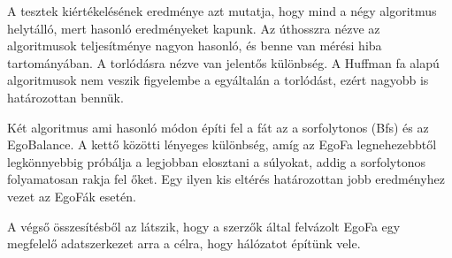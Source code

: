 \documentclass[12pt]{report}
\begin{document}
A tesztek kiértékelésének eredménye azt mutatja, hogy mind a négy algoritmus helytálló, mert hasonló eredményeket kapunk.
Az úthosszra nézve az algoritmusok teljesítménye nagyon hasonló, és benne van mérési hiba tartományában.
A torlódásra nézve van jelentős különbség.
A Huffman fa alapú algoritmusok nem veszik figyelembe a egyáltalán a torlódást, ezért nagyobb is határozottan bennük.
 
Két algoritmus ami hasonló módon építi fel a fát az a sorfolytonos (Bfs) és az EgoBalance. 
A kettő közötti lényeges különbség, amíg az EgoFa legnehezebbtől legkönnyebbig próbálja a legjobban elosztani a súlyokat, addig a sorfolytonos folyamatosan rakja fel őket.
Egy ilyen kis eltérés határozottan jobb eredményhez vezet az EgoFák esetén.

A végső összesítésből az látszik, hogy a szerzők által felvázolt EgoFa egy megfelelő adatszerkezet arra a célra, hogy hálózatot építünk vele.





	
\end{document}
